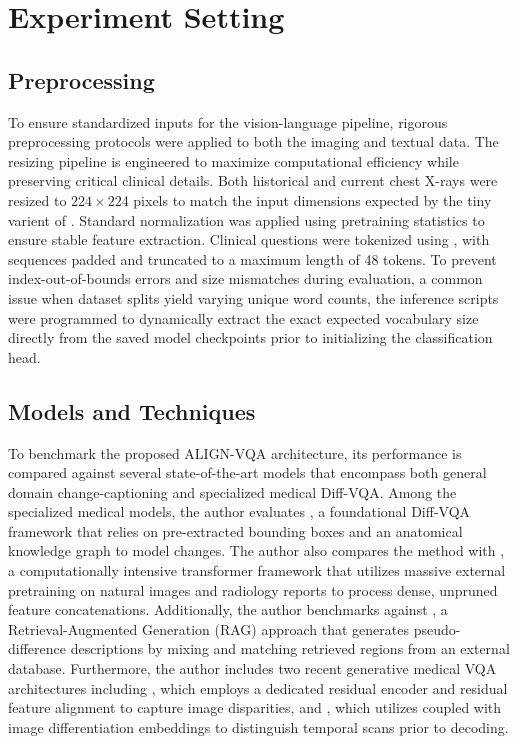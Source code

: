\section{Experiment Setting}

\subsection{Preprocessing}
To ensure standardized inputs for the vision-language pipeline, rigorous preprocessing protocols were applied to both the imaging and textual data. The resizing pipeline is engineered to maximize computational efficiency while preserving critical clinical details. Both historical and current chest X-rays were resized to $224 \times 224$ pixels to match the input dimensions expected by the tiny varient of \cite{swin}. Standard normalization was applied using \cite{cxr-clip} pretraining statistics to ensure stable feature extraction. Clinical questions were tokenized using \cite{bio-clinical-bert}, with sequences padded and truncated to a maximum length of 48 tokens. To prevent index-out-of-bounds errors and size mismatches during evaluation, a common issue when dataset splits yield varying unique word counts, the inference scripts were programmed to dynamically extract the exact expected vocabulary size directly from the saved model checkpoints prior to initializing the classification head.

\subsection{Models and Techniques}
To benchmark the proposed ALIGN-VQA architecture, its performance is compared against several state-of-the-art models that encompass both general domain change-captioning and specialized medical Diff-VQA. Among the specialized medical models, the author evaluates \cite{ekaid}, a foundational Diff-VQA framework that relies on pre-extracted bounding boxes and an anatomical knowledge graph to model changes. The author also compares the method with \cite{plural}, a computationally intensive transformer framework that utilizes massive external pretraining on natural images and radiology reports to process dense, unpruned feature concatenations. Additionally, the author benchmarks against \cite{regiomix}, a Retrieval-Augmented Generation (RAG) approach that generates pseudo-difference descriptions by mixing and matching retrieved regions from an external database. Furthermore, the author includes two recent generative medical VQA architectures including \cite{real}, which employs a dedicated residual encoder and residual feature alignment to capture image disparities, and \cite{encoder-decoder}, which utilizes \cite{swin} coupled with image differentiation embeddings to distinguish temporal scans prior to decoding.

